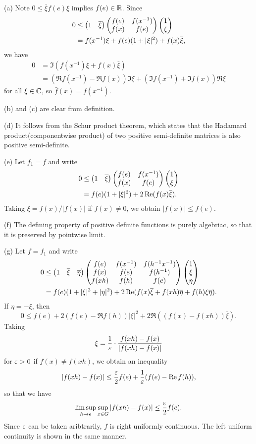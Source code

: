\documentclass[12pt]{article}
\begin{document}
\begin{pf}
(a)
Note $0\le\bar\xi f(e)\xi$ implies $f(e)\in\mathbb{R}$.
Since
\begin{align*}
0&\le\begin{pmatrix}1&\overline\xi\end{pmatrix}\begin{pmatrix}f(e)&f(x^{-1})\\f(x)&f(e)\end{pmatrix}\begin{pmatrix}1\\\xi\end{pmatrix}\\
&=f(x^{-1})\xi+f(e)(1+|\xi|^2)+f(x)\overline\xi,
\end{align*}
we have
\begin{align*}
0&=\Im(f(x^{-1})\xi+f(x)\bar\xi)\\
&=(\Re f(x^{-1})-\Re f(x))\Im\xi+(\Im f(x^{-1})+\Im f(x))\Re\xi
\end{align*}
for all $\xi\in\mathbb{C}$, so $\bar f(x)=f(x^{-1})$.

(b) and (c) are clear from definition.

(d) It follows from the Schur product theorem, which states that the Hadamard product(componentwise product) of two positive semi-definite matrices is also positive semi-definite.

(e)
Let $f_1=f$ and write
\begin{align*}
0&\le\begin{pmatrix}1&\overline\xi\end{pmatrix}\begin{pmatrix}f(e)&f(x^{-1})\\f(x)&f(e)\end{pmatrix}\begin{pmatrix}1\\\xi\end{pmatrix}\\
&=f(e)(1+|\xi|^2)+2\operatorname{Re}(f(x)\overline\xi).
\end{align*}
Taking $\xi=f(x)/|f(x)|$ if $f(x)\ne0$, we obtain $|f(x)|\le f(e)$.

(f)
The defining property of positive definite functions is purely algebriac, so that it is preserved by pointwise limit.

(g)
Let $f=f_1$ and write
\begin{align*}
0&\le\begin{pmatrix}1&\overline\xi&\overline\eta\end{pmatrix}\begin{pmatrix}f(e)&f(x^{-1})&f(h^{-1}x^{-1})\\f(x)&f(e)&f(h^{-1})\\f(xh)&f(h)&f(e)\end{pmatrix}\begin{pmatrix}1\\\xi\\\eta\end{pmatrix}\\
&=f(e)(1+|\xi|^2+|\eta|^2)+2\operatorname{Re}(f(x)\overline\xi+f(xh)\overline\eta+f(h)\xi\overline\eta).
\end{align*}
If $\eta=-\xi$, then
\[0\le f(e)+2(f(e)-\Re f(h))|\xi|^2+2\Re((f(x)-f(xh))\bar\xi).\]
Taking
\[\xi=\frac1{\varepsilon}\cdot\frac{f(xh)-f(x)}{|f(xh)-f(x)|}\]
for $\varepsilon>0$ if $f(x)\ne f(xh)$, we obtain an inequality
\[|f(xh)-f(x)|\le\frac{\varepsilon}2f(e)+\frac1{\varepsilon}(f(e)-\operatorname{Re} f(h)),\]
so that we have
\[\limsup_{h\to e}\sup_{x\in G}|f(xh)-f(x)|\le\frac{\varepsilon}2f(e).\]
Since $\varepsilon$ can be taken aribtrarily, $f$ is right uniformly continuous.
The left uniform continuity is shown in the same manner.
\end{pf}
\end{document}
